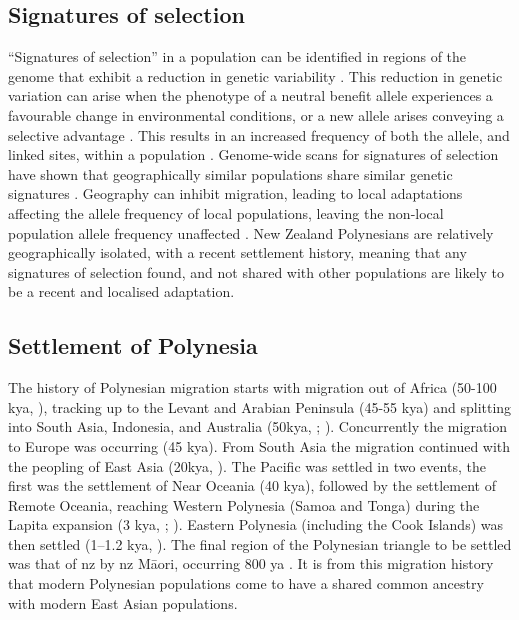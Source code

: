 \documentclass[]{report}
\newcommand{\tex}[1]{#1}
\begin{document}
\subsection{Signatures of selection}\label{signatures-of-selection}

``Signatures of selection'' in a population can be identified in regions
of the genome that exhibit a reduction in genetic variability
\citep{Smith1974, Kaplan1989, McVean2007}. This reduction in genetic
variation can arise when the phenotype of a neutral benefit allele
experiences a favourable change in environmental conditions, or a new
allele arises conveying a selective advantage \citep{Hermisson2005}.
This results in an increased frequency of both the allele, and linked
sites, within a population \citep{Smith1974}. Genome-wide scans for
signatures of selection have shown that geographically similar
populations share similar genetic signatures
\citep{Coop2009, pickrell2009signals}. Geography can inhibit migration,
leading to local adaptations affecting the allele frequency of local
populations, leaving the non-local population allele frequency
unaffected \citep{Coop2009}. New Zealand Polynesians are relatively
geographically isolated, with a recent settlement history, meaning that
any signatures of selection found, and not shared with other populations
are likely to be a recent and localised adaptation.

\subsection{Settlement of Polynesia}\label{settlement-of-polynesia-1}

The history of Polynesian migration starts with migration out of Africa
(50-100 kya, \citet{Nielsen2017}), tracking up to the Levant and Arabian
Peninsula (45-55 kya) and splitting into South Asia, Indonesia, and
Australia (50kya, \citet{Kivisild1999}; \citet{Quintana-Murci1999}).
Concurrently the migration to Europe was occurring (45 kya). From South
Asia the migration continued with the peopling of East Asia (20kya,
\citet{Groucutt2015}). The Pacific was settled in two events, the first
was the settlement of Near Oceania (40 kya), followed by the settlement
of Remote Oceania, reaching Western Polynesia (Samoa and Tonga) during
the Lapita expansion (3 kya, \citet{Matisoo-Smith2015};
\citet{Skoglund2016}). Eastern Polynesia (including the Cook Islands)
was then settled (1--1.2 kya, \citet{Wilmshurst2011}). The final region
of the Polynesian triangle to be settled was that of \gls{nz} by
\gls{nz} M\tex{\={a}}ori, occurring 800 ya
\citep{Duggan2014, Matisoo-Smith2015}. It is from this migration history
that modern Polynesian populations come to have a shared common ancestry
with modern East Asian populations.
\end{document}

